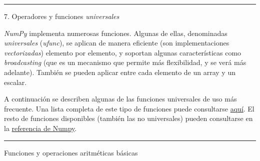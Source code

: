 \documentclass[11pt]{article}
\begin{document}
     

    \begin{center}\rule{0.5\linewidth}{\linethickness}\end{center}

 7. Operadores y funciones \emph{universales}

    \emph{NumPy} implementa numerosas funciones. Algunas de ellas,
denominadas \emph{universales} (\emph{ufunc}), se aplican de manera
eficiente (son implementaciones \emph{vectorizadas}) elemento por
elemento, y soportan algunas características como \emph{broadcasting}
(que es un mecanismo que permite más flexibilidad, y se verá más
adelante). También se pueden aplicar entre cada elemento de un array y
un escalar.

A continuación se describen algunas de las funciones universales de uso
más frecuente. Una lista completa de este tipo de funciones puede
consultarse
\href{https://docs.scipy.org/doc/numpy/reference/ufuncs.html\#available-ufuncs}{aquí}.
El resto de funciones disponibles (también las no universales) pueden
consultarse en la
\href{https://docs.scipy.org/doc/numpy/reference/index.html}{referencia
de Numpy}.

    \begin{center}\rule{0.5\linewidth}{\linethickness}\end{center}

 Funciones y operaciones aritméticas básicas
\end{document}
